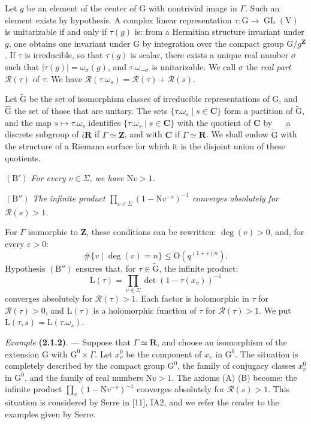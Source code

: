 \documentclass[11pt,leqno]{article}
\newcommand{\Page}[1]{\ifvmode\noindent\else\unskip\ \fi{\footnotesize\textcolor{gray}{[p.\,#1]}}\ \ignorespaces}
\begin{document}
Let \(g\) be an element of the center of \(\mathrm{G}\) with nontrivial image in \(\Gamma\). Such an element exists by hypothesis. A complex linear representation \(\tau:\mathrm{G}\to\operatorname{GL}(\mathrm{V})\) is unitarizable if and only if \(\tau(g)\) is: from a Hermitian structure invariant under \(g\), one obtains one invariant under \(\mathrm{G}\) by integration over the compact group \(\mathrm{G}/g^{\mathbf{Z}}\). If \(\tau\) is irreducible, so that \(\tau(g)\) is scalar, there exists a unique real number \(\sigma\) such that \(|\tau(g)|=\omega_\sigma(g)\), and \(\tau.\omega_{-\sigma}\) is unitarizable. We call \(\sigma\) the \textit{real part} \(\mathscr{R}(\tau)\) of \(\tau\). We have \(\mathscr{R}(\tau.\omega_s)=\mathscr{R}(\tau)+\mathscr{R}(s)\).

Let \(\widetilde{\mathrm{G}}\) be the set of isomorphism classes of irreducible representations of \(\mathrm{G}\), and \(\widehat{\mathrm{G}}\) the set of those that are unitary. The sets \(\{\tau.\omega_s\mid s\in\mathbf{C}\}\) form a partition of \(\widetilde{\mathrm{G}}\), and the map \(s\mapsto\tau.\omega_s\) identifies \(\{\tau.\omega_s\mid s\in\mathbf{C}\}\) with the quotient of \(\mathbf{C}\) by
\Page{188}
a discrete subgroup of \(i\mathbf{R}\) if \(\Gamma\simeq\mathbf{Z}\), and with \(\mathbf{C}\) if \(\Gamma\simeq\mathbf{R}\). We shall endow \(\widetilde{\mathrm{G}}\) with the structure of a Riemann surface for which it is the disjoint union of these quotients.

\((\mathrm{B}')\) \textit{For every \(v\in\Sigma\), we have \(\mathrm{N}v>1\).}

\((\mathrm{B}'')\) \textit{The infinite product \(\displaystyle\prod_{v\in\Sigma}(1-\mathrm{N}v^{-s})^{-1}\) converges absolutely for \(\mathscr{R}(s)>1\).}

For \(\Gamma\) isomorphic to \(\mathbf{Z}\), these conditions can be rewritten: \(\deg(v)>0\), and, for every \(\varepsilon>0\):
\[
\#\{v\mid\deg(v)=n\}\leq\mathrm{O}(q^{(1+\varepsilon)n}).
\]
Hypothesis \((\mathrm{B}'')\) ensures that, for \(\tau\in\widetilde{\mathrm{G}}\), the infinite product:
\[
\mathrm{L}(\tau)=\prod_{v\in\Sigma}\det(1-\tau(x_v))^{-1}
\]
converges absolutely for \(\mathscr{R}(\tau)>1\). Each factor is holomorphic in \(\tau\) for \(\mathscr{R}(\tau)>0\), and \(\mathrm{L}(\tau)\) is a holomorphic function of \(\tau\) for \(\mathscr{R}(\tau)>1\). We put \(\mathrm{L}(\tau,s)=\mathrm{L}(\tau.\omega_s)\).

\textit{Example} \textbf{(2.1.2)}. — Suppose that \(\Gamma\simeq\mathbf{R}\), and choose an isomorphism of the extension \(\mathrm{G}\) with \(\mathrm{G}^0\times\Gamma\). Let \(x_v^0\) be the component of \(x_v\) in \(\mathrm{G}^0\). The situation is completely described by the compact group \(\mathrm{G}^0\), the family of conjugacy classes \(x_v^0\) in \(\mathrm{G}^0\), and the family of real numbers \(\mathrm{N}v>1\). The axioms (A) (B) become: the infinite product \(\displaystyle\prod_v(1-\mathrm{N}v^{-s})^{-1}\) converges absolutely for \(\mathscr{R}(s)>1\). This situation is considered by Serre in [11], IA2, and we refer the reader to the examples given by Serre.
\end{document}
